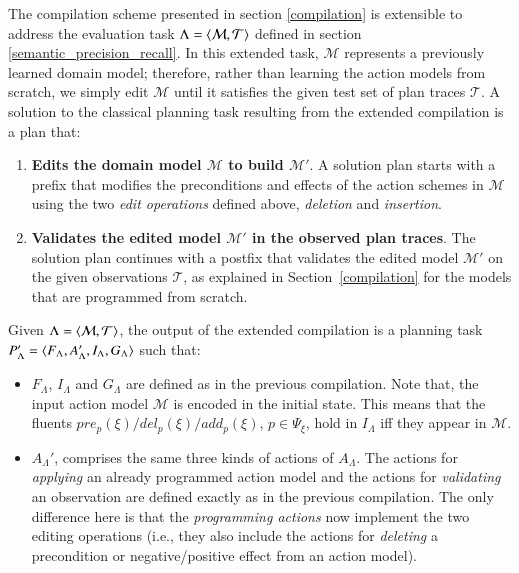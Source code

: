 The compilation scheme presented in section \ref{compilation} is extensible to address the evaluation task $\Lambda={\langle \mathcal{M}, \mathcal{T} \rangle}$ defined in section \ref{semantic_precision_recall}. In this extended task, $\mathcal{M}$ represents a previously learned domain model; therefore, rather than learning the action models from scratch, we simply edit $\mathcal{M}$ until it satisfies the given test set of plan traces $\mathcal{T}$. A solution to the classical planning task resulting from the extended compilation is a plan that:

\begin{enumerate}
\item {\bf Edits the domain model $\mathcal{M}$ to build $\mathcal{M}'$}. A solution plan starts with a prefix that modifies the preconditions and effects of the action schemes in $\mathcal{M}$ using the two {\em edit operations} defined above, {\em deletion} and {\em insertion}.
\item {\bf Validates the edited model $\mathcal{M}'$ in the observed plan traces}. The solution plan continues with a postfix that validates the edited model $\mathcal{M}'$ on the given observations $\mathcal{T}$, as explained in Section~\ref{compilation} for the models that are programmed from scratch.
\end{enumerate}

Given $\Lambda={\langle \mathcal{M},\mathcal{T} \rangle}$, the output of the extended compilation is a planning task $P_{\Lambda}'={\langle F_{\Lambda},A_{\Lambda}',I_{\Lambda},G_{\Lambda} \rangle}$ such that:

\begin{itemize}
\item $F_{\Lambda}$, $I_{\Lambda}$ and $G_{\Lambda}$ are defined as in the previous compilation. Note that, the input action model $\mathcal{M}$ is encoded in the initial state. This means that the fluents $pre_p(\xi)/del_p(\xi)/add_p(\xi)$, $p\in \Psi_\xi$, hold in $I_{\Lambda}$ iff they appear in $\mathcal{M}$.
\item $A_{\Lambda}'$, comprises the same three kinds of actions of $A_{\Lambda}$. The actions for {\em applying} an already programmed action model and the actions for {\em validating} an observation are defined exactly as in the previous compilation. The only difference here is that the {\em programming actions} now implement the two editing operations (i.e., they also include the actions for {\em deleting} a precondition or negative/positive effect from an action model).
\end{itemize}

